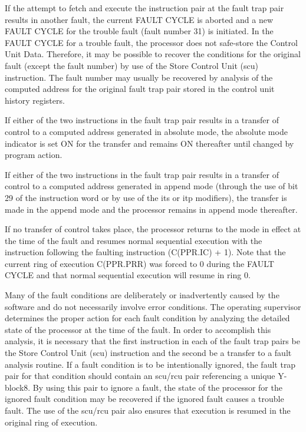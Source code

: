 If the attempt to fetch and execute the instruction pair at the fault trap pair
results in another fault, the current FAULT CYCLE is aborted and a new FAULT
CYCLE for the trouble fault (fault number 31) is initiated. In the FAULT CYCLE
for a trouble fault, the processor does not safe-store the Control Unit Data.
Therefore, it may be possible to recover the conditions for the original fault
(except the fault number) by use of the Store Control Unit (scu) instruction.
The fault number may usually be recovered by analysis of the computed address
for the original fault trap pair stored in the control unit history registers.


If either of the two instructions in the fault trap pair results in a transfer
of control to a computed address generated in absolute mode, the absolute mode
indicator is set ON for the transfer and remains ON thereafter until changed by
program action.


If either of the two instructions in the fault trap pair results in a transfer
of control to a computed address generated in append mode (through the use of
bit 29 of the instruction word or by use of the its or itp modifiers), the
transfer is made in the append mode and the processor remains in append mode
thereafter.


If no transfer of control takes place, the processor returns to the mode in
effect at the time of the fault and resumes normal sequential execution with
the instruction following the faulting instruction (C(PPR.IC) + 1). Note that
the current ring of execution C(PPR.PRR) was forced to 0 during the FAULT CYCLE
and that normal sequential execution will resume in ring 0.

Many of the fault conditions are deliberately or inadvertently caused by the
software and do not necessarily involve error conditions. The operating
supervisor determines the proper action for each fault condition by analyzing
the detailed state of the processor at the time of the fault. In order to
accomplish this analysis, it is necessary that the first instruction in each of
the fault trap pairs be the Store Control Unit (scu) instruction and the second
be a transfer to a fault analysis routine. If a fault condition is to be
intentionally ignored, the fault trap pair for that condition should contain an
scu/rcu pair referencing a unique Y-block8. By using this pair to ignore a
fault, the state of the processor for the ignored fault condition may be
recovered if the ignored fault causes a trouble fault. The use of the scu/rcu
pair also ensures that execution is resumed in the original ring of execution.

